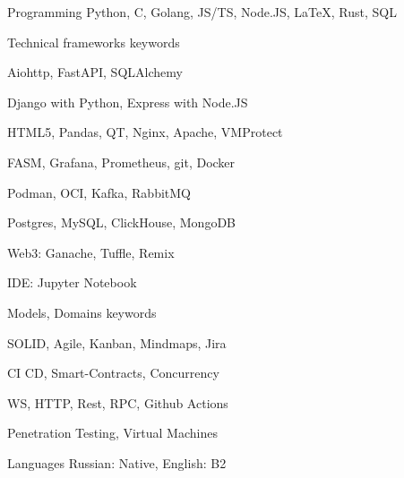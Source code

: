 


\begin{cvskills}


\cvskill
{Programming} %
{Python, C, Golang, JS/TS, Node.JS, LaTeX, Rust, SQL} %


\cvskill
{Technical frameworks keywords} %
{
\begin{cvitems}
\item{Aiohttp, FastAPI, SQLAlchemy}
\item{Django with Python, Express with Node.JS}
\item{HTML5, Pandas, QT, Nginx, Apache, VMProtect}
\item{FASM, Grafana, Prometheus, git, Docker}
\item{Podman, OCI, Kafka, RabbitMQ}
\item{Postgres, MySQL, ClickHouse, MongoDB}
\item{Web3: Ganache, Tuffle, Remix}
\item{IDE: Jupyter Notebook}
\end{cvitems}
} %

\cvskill
{Models, Domains keywords} %
{
\begin{cvitems}
\item{SOLID, Agile, Kanban, Mindmaps, Jira}
\item{CI CD, Smart-Contracts, Concurrency}
\item{WS, HTTP, Rest, RPC, Github Actions}
\item{Penetration Testing, Virtual Machines}
\end{cvitems}
} %


\cvskill
{Languages} %
{Russian: Native, English: B2} %


\end{cvskills}